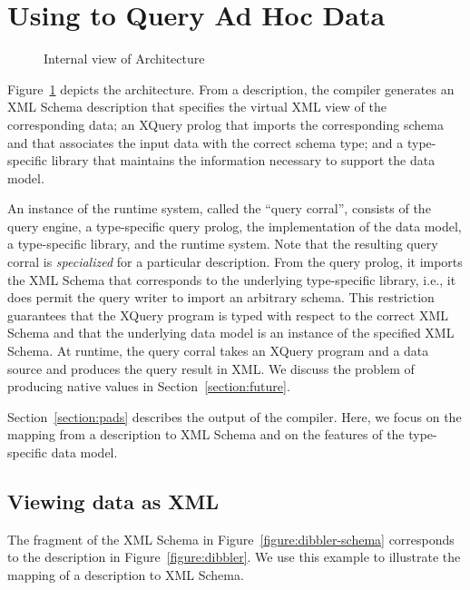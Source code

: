 \section{Using \padx{} to Query Ad Hoc Data}
\label{section:padx}

\begin{figure}
\begin{center}
\end{center}
\caption{Internal view of \padx{} Architecture}
\label{figure:padx-arch}
\end{figure}

Figure~\ref{figure:padx-arch} depicts the \padx{} architecture.  From
a \pads{} description, the compiler generates an XML Schema
description that specifies the virtual XML view of the corresponding
\pads{} data; an XQuery prolog that imports the corresponding schema
and that associates the input data with the correct schema type; and a
type-specific library that maintains the information necessary to
support the \padx{} data model.

An instance of the \padx{} runtime system, called the ``query
corral'', consists of the \Galax{} query engine, a type-specific query
prolog, the \padx{} implementation of the \Galax{} data model, a
type-specific \padx{} library, and the \pads{} runtime system.  Note
that the resulting query corral is \emph{specialized} for a particular
\pads{} description.  From the query prolog, it imports the XML Schema
that corresponds to the underlying type-specific library, i.e., it
does permit the query writer to import an arbitrary schema.  This
restriction guarantees that the XQuery program is typed with respect
to the correct XML Schema and that the underlying data model is an
instance of the specified XML Schema.  At runtime, the query corral
takes an XQuery program and a \pads{} data source and produces the
query result in XML.  We discuss the problem of producing native
\pads{} values in Section~\ref{section:future}. 

Section~\ref{section:pads} describes the output of the \pads{}
compiler.  Here, we focus on the mapping from a description to XML
Schema and on the features of the type-specific data model.

\subsection{Viewing \pads{} data as XML}	

The fragment of the XML Schema in Figure~\ref{figure:dibbler-schema}
corresponds to the description in Figure~\ref{figure:dibbler}.  We use
this example to illustrate the mapping of a \pads{} description to XML
Schema.

